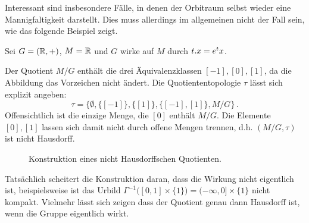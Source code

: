 Interessant sind insbesondere Fälle, in denen der Orbitraum selbst wieder eine
Mannigfaltigkeit darstellt. Dies muss allerdings im allgemeinen nicht der Fall
sein, wie das folgende Beispiel zeigt.
\begin{beispiel} Sei $G=(\mathbb{R},+)$, $M=\mathbb{R}$ und $G$ wirke auf
$M$ durch $t . x=e^tx$.

Der Quotient $M/G$ enthält die drei Äquivalenzklassen $[-1],[0],[1]$, da die
Abbildung das Vorzeichen nicht ändert.
Die Quotiententopologie $\tau$ lässt sich explizit angeben:
\begin{equation}
\tau =\big\{\emptyset,\{[-1]\},\{[1]\},\{[-1],[1]\},M/G\big\}\,.
\end{equation}
Offensichtlich ist die einzige Menge, die $[0]$ enthält $M/G$. Die Elemente
$[0],[1]$ lassen sich damit nicht durch offene Mengen trennen, d.h. $(M/G,\tau)$
ist nicht Hausdorff.
\begin{figure}[!htbp]
\centering
{}
\caption{Konstruktion eines nicht Hausdorffschen Quotienten.}
\end{figure}
\end{beispiel}
Tatsächlich scheitert die Konstruktion daran, dass die Wirkung nicht eigentlich
ist, beispielsweise ist das Urbild $\Gamma^{-1}\big([0,1]\times
\{1\}\big)=(-\infty,0]\times \{1\}$ nicht kompakt.
Vielmehr lässt sich zeigen dass der Quotient genau dann Hausdorff ist, wenn die
Gruppe eigentlich wirkt. %

